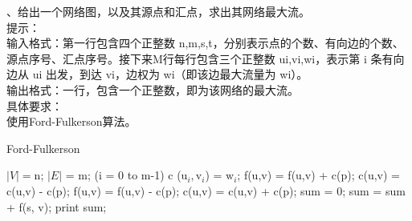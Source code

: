 \documentclass[a4paper, 10pt]{ctexart} %
\begin{document}
、给出一个网络图，以及其源点和汇点，求出其网络最大流。\\
提示：\\
输入格式：第一行包含四个正整数 n,m,s,t，分别表示点的个数、有向边的个数、源点序号、汇点序号。接下来M行每行包含三个正整数 ui,vi,wi，表示第 i 条有向边从 ui 出发，到达 vi，边权为 wi（即该边最大流量为 wi）。\\
输出格式：一行，包含一个正整数，即为该网络的最大流。\\
具体要求：\\
	使用Ford-Fulkerson算法。
\newpage
{} 
\begin{algorithm}
    \caption{Ford-Fulkerson}
    \begin{algorithmic}[1]
    \State $|V|  =$n; $|E|$ = m;
    \For (i = 0 to m-1) 
    \State c ($\text{u}_{i}, \text{v}_{i}$) = $\text{w}_i$;
    \EndFor
    \State f(u,v) = f(u,v) + c(p);
    \State c(u,v) = c(u,v) - c(p);
    \Else 
    \State f(u,v) = f(u,v) - c(p);
    \State c(u,v) = c(u,v) + c(p);
    \EndIf
    \EndFor
    \EndWhile
    \State sum = 0;
     
    \State sum = sum + f(s, v);
    \EndFor
    \State print sum;
    \end{algorithmic}
\end{algorithm}
\end{document}
